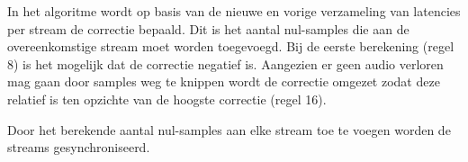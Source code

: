 In het algoritme wordt op basis van de nieuwe en vorige verzameling van latencies per stream de correctie bepaald. Dit is het aantal nul-samples die aan de overeenkomstige stream moet worden toegevoegd. Bij de eerste berekening (regel 8) is het mogelijk dat de correctie negatief is. Aangezien er geen audio verloren mag gaan door samples weg te knippen wordt de correctie omgezet zodat deze relatief is ten opzichte van de hoogste correctie (regel 16). 

Door het berekende aantal nul-samples aan elke stream toe te voegen worden de streams gesynchroniseerd.